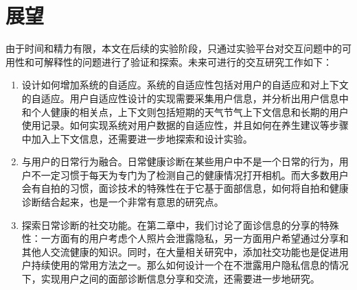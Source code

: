 \section{展望}
由于时间和精力有限，本文在后续的实验阶段，只通过实验平台对交互问题中的可用性和可解释性的问题进行了验证和探索。未来可进行的交互研究工作如下：

\begin{enumerate}
	\item 设计如何增加系统的自适应。系统的自适应性包括对用户的自适应和对上下文的自适应。用户自适应性设计的实现需要采集用户信息，并分析出用户信息中和个人健康的相关点，上下文则包括短期的天气节气上下文信息和长期的用户使用记录。如何实现系统对用户数据的自适应性，并且如何在养生建议等步骤中加入上下文信息，还需要进一步地探索和设计实验。

	\item 与用户的日常行为融合。日常健康诊断在某些用户中不是一个日常的行为，用户不一定习惯于每天为专门为了检测自己的健康情况打开相机。而大多数用户会有自拍的习惯，面诊技术的特殊性在于它基于面部信息，如何将自拍和健康诊断结合起来，也是一个非常有意思的研究点。

	\item 探索日常诊断的社交功能。在第二章中，我们讨论了面诊信息的分享的特殊性：一方面有的用户考虑个人照片会泄露隐私，另一方面用户希望通过分享和其他人交流健康的知识。同时，在大量相关研究中，添加社交功能也是促进用户持续使用的常用方法之一。那么如何设计一个在不泄露用户隐私信息的情况下，实现用户之间的面部诊断信息分享和交流，还需要进一步地研究。
	
\end{enumerate}